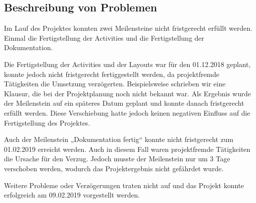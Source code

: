 \newpage
\subsection{Beschreibung von Problemen}

Im Lauf des Projektes konnten zwei Meilensteine nicht fristgerecht erfüllt werden. Einmal die Fertigstellung der Activities und die Fertigstellung der Dokumentation.
 
Die Fertigstellung der Activities und der Layouts war für den 01.12.2018 geplant, konnte jedoch nicht fristgerecht fertiggestellt werden, da projektfremde Tätigkeiten die Umsetzung verzögerten. Beispielsweise schrieben wir eine Klausur, die bei der Projektplanung noch nicht bekannt war. Als Ergebnis wurde der Meilenstein auf ein späteres Datum geplant und konnte danach fristgerecht erfüllt werden. Diese Verschiebung hatte jedoch keinen negativen Einfluss auf die Fertigstellung des Projektes.

Auch der Meilenstein „Dokumentation fertig“ konnte nicht fristgerecht zum 01.02.2019 erreicht werden. Auch in diesem Fall waren projektfremde Tätigkeiten die Ursache für den Verzug. Jedoch musste der Meilenstein nur um 3 Tage verschoben werden, wodurch das Projektergebnis nicht gefährdet wurde.

Weitere Probleme oder Verzögerungen traten nicht auf und das Projekt konnte erfolgreich am 09.02.2019 vorgestellt werden.



